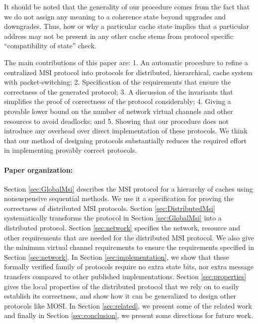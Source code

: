 It should be noted that the generality of our procedure comes from the fact
that we do not assign any meaning to a coherence state beyond upgrades and
downgrades. Thus, how or why a particular cache state implies that a particular
address may not be present in any other cache stems from protocol specific
``compatibility of state'' check. 

The main contributions of this paper are: 1. An automatic procedure to refine a
centralized MSI protocol into protocols for
distributed, hierarchical, cache system with packet-switching; 2. Specification
of the requirements that ensure the correctness of the generated protocol;
3. A discussion of the invariants that simplifies the proof of correctness of
the protocol considerably;
4. Giving a provable lower bound on the number of network virtual channels and
other resources to avoid deadlocks; and 5. Showing that our procedure does not
introduce any overhead over direct implementation of these protocols. We think
that our method of designing protocols substantially reduces the required
effort in implementing provably correct protocols. 

\paragraph{Paper organization:} Section \ref{sec:GlobalMsi} describes the MSI
protocol for a hierarchy of caches using nonsuspensive sequential methods. We
use it a specification for proving the correctness of distributed MSI
protocols. Section \ref{sec:DistributedMsi} systematically transforms the
protocol in Section \ref{sec:GlobalMsi} into a distributed protocol. Section
\ref{sec:network} specifies the network, resource and other requirements that
are needed for the distributed MSI protocol. We also give the minimum virtual
channel requirements to ensure the requirements specified in Section
\ref{sec:network}. In Section \ref{sec:implementation}, we show that these formally verified family of protocols
require no extra state bits, nor extra message transfers compared to other
published implementations. Section \ref{sec:properties} gives the local
properties of the distributed protocol that we rely on to easily establish its
correctness, and show how it can be generalized to design other protocols like MOSI.
In Section \ref{sec:related}, we present some of the related work and finally
in Section \ref{sec:conclusion}, we present some directions for future work.
